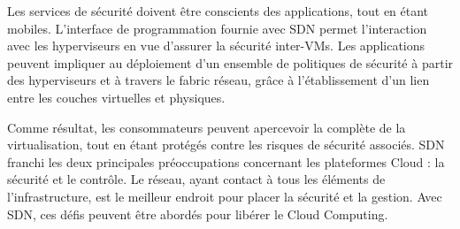 Les services de sécurité doivent être conscients des applications, tout en étant mobiles. L'interface de programmation fournie avec SDN permet l'interaction avec les hyperviseurs en vue d'assurer la sécurité inter-VMs. Les applications peuvent impliquer au déploiement d'un ensemble de politiques de sécurité à partir des hyperviseurs et à travers le \gls{fabric} réseau, grâce à l'établissement d'un lien entre les couches virtuelles et physiques. 

Comme résultat, les consommateurs peuvent apercevoir la complète de la virtualisation, tout en étant protégés contre les risques de sécurité associés. SDN franchi les deux principales préoccupations concernant les plateformes Cloud : la sécurité et le contrôle. Le réseau, ayant contact à tous les éléments de l'infrastructure, est le meilleur endroit pour placer la sécurité et la gestion. Avec SDN, ces défis peuvent être abordés pour libérer le Cloud Computing. 

